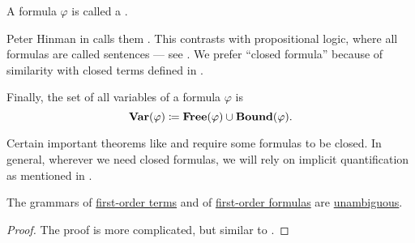 \begin{definition}
\begin{thmenum}
     A formula \( \varphi \) is called a .

    Peter Hinman in  calls them . This contrasts with propositional logic, where all formulas are called sentences --- see . We prefer \enquote{closed formula} because of similarity with closed terms defined in .

     Finally, the set of all variables of a formula \( \varphi \) is
    \begin{equation*}
      \op*{Var}(\varphi) \coloneqq \op*{Free}(\varphi) \cup \op*{Bound}(\varphi).
    \end{equation*}
  \end{thmenum}
\end{definition}
\begin{comments}
  \item Certain important theorems like  and  require some formulas to be closed. In general, wherever we need closed formulas, we will rely on implicit quantification as mentioned in .
\end{comments}

\begin{proposition}\label{thm:first_order_terms_and_formulas_are_unambiguous}
  The grammars of \hyperref[def:first_order_syntax/term]{first-order terms} and of \hyperref[def:first_order_syntax/formula]{first-order formulas} are \hyperref[def:grammar_ambiguity]{unambiguous}.
\end{proposition}
\begin{proof}
  The proof is more complicated, but similar to .
\end{proof}

\begin{remark}\label{rem:postfix_notation}
\end{remark}

